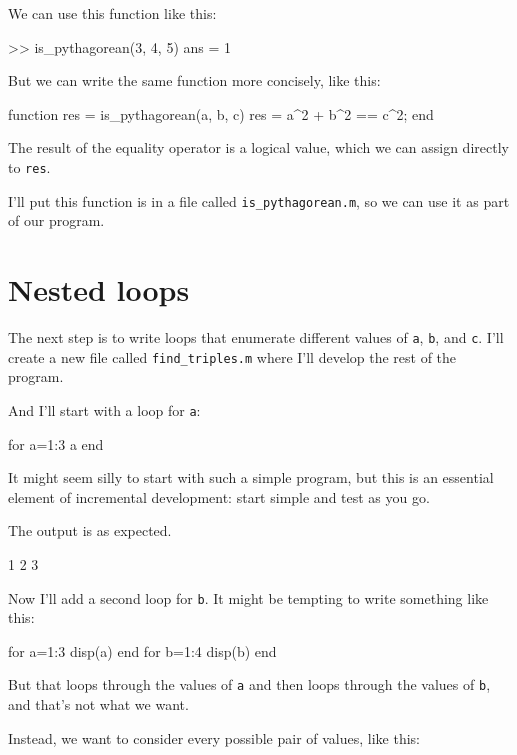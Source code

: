We can use this function like this:

\begin{code}
>> is_pythagorean(3, 4, 5)
ans = 1
\end{code}

But we can write the same function more concisely, like this:

\begin{code}
function res = is_pythagorean(a, b, c)
    res = a^2 + b^2 == c^2;
end
\end{code}

The result of the equality operator is a logical value, which we can assign directly 
to {\tt res}.

I'll put this function is in a file called \verb"is_pythagorean.m", so we can use it as part of our program.


\section{Nested loops}

The next step is to write loops that enumerate different values of {\tt a}, {\tt b}, and 
{\tt c}.  I'll create a new file called \verb"find_triples.m" where I'll develop the rest of the program.


And I'll start with a loop for {\tt a}:

\begin{code}
for a=1:3
    a
end
\end{code}

It might seem silly to start with such a simple program, but this is an essential element of incremental development: start simple and test as you go.

The output is as expected.

\begin{code}
1
2
3
\end{code}

Now I'll add a second loop for {\tt b}.  It might be tempting to write something like this:

\begin{code}
for a=1:3
    disp(a)
end
for b=1:4
    disp(b)
end
\end{code}

But that loops through the values of {\tt a} and then loops through the values of {\tt b}, and that's not what we want.

Instead, we want to consider every possible pair of values, like this:


